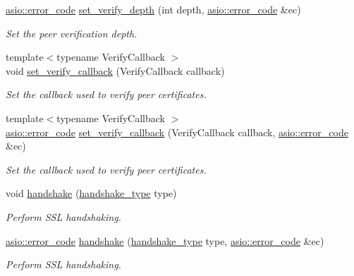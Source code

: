 \begin{DoxyCompactItemize}
\hyperlink{classasio_1_1error__code}{asio\+::error\+\_\+code} \hyperlink{classasio_1_1ssl_1_1stream_ae763a8920398d953bd3a579d304a4eea}{set\+\_\+verify\+\_\+depth} (int depth, \hyperlink{classasio_1_1error__code}{asio\+::error\+\_\+code} \&ec)
\begin{DoxyCompactList}\small\item\em Set the peer verification depth. \end{DoxyCompactList}\item 
{\footnotesize template$<$typename Verify\+Callback $>$ }\\void \hyperlink{classasio_1_1ssl_1_1stream_ae3fbf34c4cd1386754e8395b8e2ce65e}{set\+\_\+verify\+\_\+callback} (Verify\+Callback callback)
\begin{DoxyCompactList}\small\item\em Set the callback used to verify peer certificates. \end{DoxyCompactList}\item 
{\footnotesize template$<$typename Verify\+Callback $>$ }\\\hyperlink{classasio_1_1error__code}{asio\+::error\+\_\+code} \hyperlink{classasio_1_1ssl_1_1stream_acb1280084ded1f363786189fb10f37c5}{set\+\_\+verify\+\_\+callback} (Verify\+Callback callback, \hyperlink{classasio_1_1error__code}{asio\+::error\+\_\+code} \&ec)
\begin{DoxyCompactList}\small\item\em Set the callback used to verify peer certificates. \end{DoxyCompactList}\item 
void \hyperlink{classasio_1_1ssl_1_1stream_ab033983103661135df087954a0a104a4}{handshake} (\hyperlink{classasio_1_1ssl_1_1stream__base_a2f18813d3860bc8aee99249834d7c320}{handshake\+\_\+type} type)
\begin{DoxyCompactList}\small\item\em Perform S\+S\+L handshaking. \end{DoxyCompactList}\item 
\hyperlink{classasio_1_1error__code}{asio\+::error\+\_\+code} \hyperlink{classasio_1_1ssl_1_1stream_a9c29dd73d942a7167569e67234e006bf}{handshake} (\hyperlink{classasio_1_1ssl_1_1stream__base_a2f18813d3860bc8aee99249834d7c320}{handshake\+\_\+type} type, \hyperlink{classasio_1_1error__code}{asio\+::error\+\_\+code} \&ec)
\begin{DoxyCompactList}\small\item\em Perform S\+S\+L handshaking. \end{DoxyCompactList}\item 

\end{DoxyCompactItemize}
